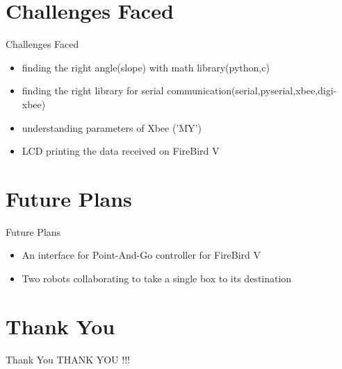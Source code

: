 \documentclass[10pt, a4paper]{beamer}
\begin{document}
\section{Challenges Faced}
\begin{frame}{Challenges Faced}
	\begin{itemize}
	    \item finding the right angle(slope) with math library(python,c)
		\item finding the right library for serial communication(serial,pyserial,xbee,digi-xbee)
		\item understanding parameters of Xbee ('MY')
		\item LCD printing the data received on FireBird V 
	\end{itemize}
\end{frame}

\section{Future Plans}
\begin{frame}{Future Plans}
	\begin{itemize}
		\item An interface for Point-And-Go controller for FireBird V
		\item Two robots collaborating to take a single box to its destination
	\end{itemize}
\end{frame}


\section{Thank You}
\begin{frame}{Thank You}
	\centering THANK YOU !!!
\end{frame}
\end{document}
